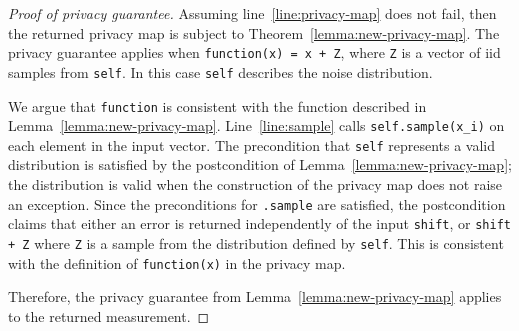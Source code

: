 \documentclass{article}
\begin{document}
\begin{proof}[Proof of privacy guarantee]
    Assuming line~\ref{line:privacy-map} does not fail,
    then the returned privacy map is subject to Theorem~\ref{lemma:new-privacy-map}.
    The privacy guarantee applies when \texttt{function(x) = x + Z}, where \texttt{Z} is a vector of iid samples from \texttt{self}.
    In this case \texttt{self} describes the noise distribution.

    We argue that \texttt{function} is consistent with the function described in Lemma~\ref{lemma:new-privacy-map}.
    Line~\ref{line:sample} calls \texttt{self.sample(x\_i)} on each element in the input vector.
    The precondition that \texttt{self} represents a valid distribution is satisfied by the postcondition of Lemma~\ref{lemma:new-privacy-map};
    the distribution is valid when the construction of the privacy map does not raise an exception.
    Since the preconditions for \texttt{.sample} are satisfied,
    the postcondition claims that either an error is returned independently of the input \texttt{shift},
    or \texttt{shift + Z} where \texttt{Z} is a sample from the distribution defined by \texttt{self}.
    This is consistent with the definition of \texttt{function(x)} in the privacy map.

    Therefore, the privacy guarantee from Lemma~\ref{lemma:new-privacy-map} applies to the returned measurement.
\end{proof}
\end{document}
